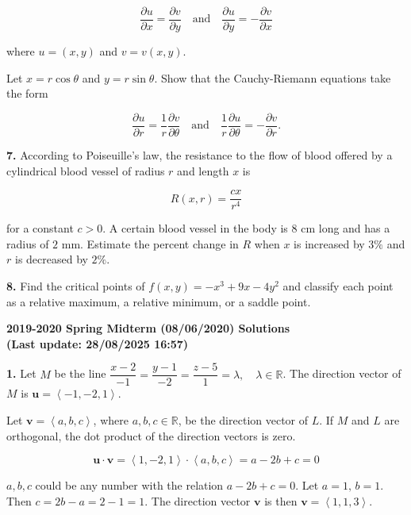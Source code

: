 \documentclass{article}
\begin{document}
\[\frac{\partial u}{\partial x}=\frac{\partial v}{\partial y}\quad\text{and}\quad\frac{\partial u}{\partial y}=-\frac{\partial v}{\partial x}\]

where $u=(x,y)$ and $v=v(x,y)$.

Let $x=r\cos\theta$ and $y=r\sin\theta$. Show that the Cauchy-Riemann equations take the form

\[\frac{\partial u}{\partial r} = \frac{1}{r} \frac{\partial v}{\partial\theta} \quad\text{and}\quad\frac1r\frac{\partial u}{\partial\theta}=-\frac{\partial v}{\partial r}.\]

\newpage


\textbf{7.} According to Poiseuille’s law, the resistance to the flow of blood offered by a cylindrical blood vessel of radius $r$ and length $x$ is

\[R(x,r) = \frac{cx}{r^4}\]

for a constant $c > 0$. A certain blood vessel in the body is 8 cm long and has a radius of $2$ mm. Estimate the percent change in $R$ when $x$ is increased by $3\%$ and $r$ is decreased by $2\%$.

\vspace{1em}

\textbf{8.} Find the critical points of $f(x, y)=-x^3+9x-4y^2$ and classify each point as a relative maximum, a relative minimum, or a saddle point.

\newpage

\begin{center}
\textbf{2019-2020 Spring Midterm (08/06/2020) Solutions\\
(Last update: 28/08/2025 16:57)}
\end{center}

\textbf{1.} Let $M$ be the line $\dfrac{x-2}{-1}=\dfrac{y-1}{-2}=\dfrac{z-5}{1}=\lambda,\quad\lambda\in\mathbb{R}$. The direction vector of $M$ is $\mathbf u=\left\langle-1,-2,1\right\rangle$.

Let $\mathbf v=\left\langle a,b,c\right\rangle$, where $a,b,c\in\mathbb R$, be the direction vector of $L$. If $M$ and $L$ are orthogonal, the dot product of the direction vectors is zero.

\[\mathbf u\cdot\mathbf v=\left\langle1,-2,1\right\rangle\cdot\left\langle a,b,c\right\rangle=a-2b+c=0\]

$a,b,c$ could be any number with the relation $a-2b+c=0$. Let $a=1,\, b=1$. Then $c=2b-a=2-1=1$. The direction vector $\mathbf v$ is then $\mathbf v=\left\langle1,1,3\right\rangle$.
\end{document}
